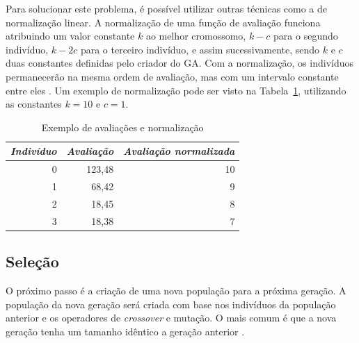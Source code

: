 \documentclass[12pt,oneside,a4paper,english,french,spanish,brazil,]{abntex2}
\begin{document}
Para solucionar este problema, é possível utilizar outras técnicas como a de normalização linear. A normalização de uma função de avaliação funciona atribuindo um valor constante \(k\) ao melhor cromossomo, \(k - c\) para o segundo indivíduo, \(k - 2c\) para o terceiro indivíduo, e assim sucessivamente, sendo \(k\) e \(c\) duas constantes definidas pelo criador do GA. Com a normalização, os indivíduos permanecerão na mesma ordem de avaliação, mas com um intervalo constante entre eles  \cite{linden:2008}. Um exemplo de normalização pode ser visto na Tabela~\ref{tab:Normalizacao_Avaliacao}, utilizando as constantes \(k = 10\) e \(c = 1\).

\begin{table}[tbp]
\centering
\caption{Exemplo de avaliações e normalização}
\label{tab:Normalizacao_Avaliacao}
\begin{tabular}{rrr}
\hline
\multicolumn{1}{l}{\textit{\textbf{Indivíduo}}} & \multicolumn{1}{l}{\textit{\textbf{Avaliação}}} & \multicolumn{1}{l}{\textit{\textbf{Avaliação normalizada}}} \\ \hline
0                                                & 123,48                                           & 10                                                           \\
1                                                & 68,42                                            & 9                                                            \\
2                                                & 18,45                                            & 8                                                            \\
3                                                & 18,38                                            & 7    \\ \hline                                                       
\end{tabular}
\end{table}

\subsection{Seleção}

O próximo passo é a criação de uma nova população para a próxima geração. A população da nova geração será criada com base nos indivíduos da população anterior e os operadores de \textit{crossover} e mutação. O mais comum é que a nova geração tenha um tamanho idêntico a geração anterior \cite{linden:2008}.
\end{document}
